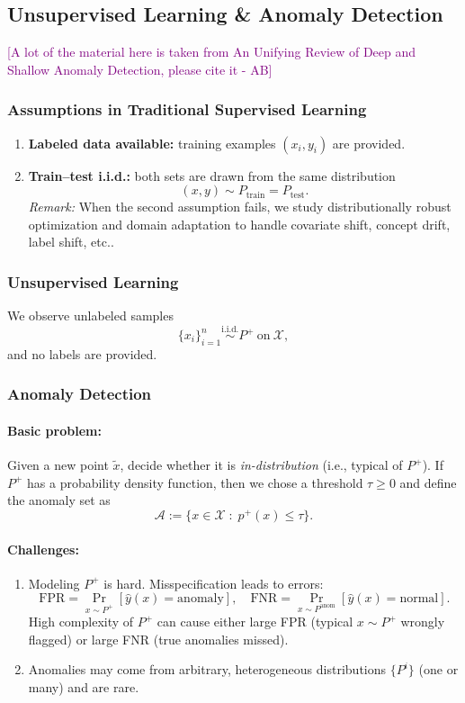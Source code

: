 \documentclass[11pt]{article}
\newcommand{\ab}[1]{\textcolor{purple}{[#1 - AB]}}
\theoremstyle{plain}
\begin{document}
\subsection{Unsupervised Learning \& Anomaly Detection}

\ab{A lot of the material here is taken from An Unifying Review of Deep and Shallow Anomaly Detection, please cite it}

\subsubsection{Assumptions in Traditional Supervised Learning}
\begin{enumerate}
  \item \textbf{Labeled data available:} training examples $(x_i,y_i)$ are provided.
  \item \textbf{Train--test i.i.d.:} both sets are drawn from the same distribution
  \[
    (x,y)\sim P_{\text{train}}=P_{\text{test}}.
  \]
  \textit{Remark:} When the second assumption fails, we study distributionally
  robust optimization and domain adaptation to handle covariate shift, concept
  drift, label shift, etc..
\end{enumerate}

\subsubsection{Unsupervised Learning}
We observe unlabeled samples
\[
  \{x_i\}_{i=1}^n \stackrel{\text{i.i.d.}}{\sim} P^{+}\ \text{on}\ \mathcal X,
\]
and no labels are provided.

\subsubsection{Anomaly Detection}
\paragraph{Basic problem:}
Given a new point $\tilde x$, decide whether it is \emph{in-distribution} (i.e., typical of $P^{+}$).
If $P^{+}$ has a probability density function, then we chose a threshold $\tau\ge 0$ and define the anomaly set as
\[
  \mathcal A := \{x\in\mathcal X \;:\; p^{+}(x)\le \tau\}.
\]

\paragraph{Challenges:}
\begin{enumerate}
  \item Modeling $P^{+}$ is hard. Misspecification leads to errors:
  \[
    \text{FPR}=\Pr_{x\sim P^{+}}[\hat y(x)=\text{anomaly}],\quad
    \text{FNR}=\Pr_{x\sim P^{\text{anom}}}[\hat y(x)=\text{normal}].
  \]
  High complexity of $P^{+}$ can cause either large FPR (typical $x\sim P^{+}$ wrongly flagged) or large FNR (true anomalies missed).
  \item Anomalies may come from arbitrary, heterogeneous distributions $\{P^{i}\}$ (one or many) and are rare.
\end{enumerate}
\end{document}
